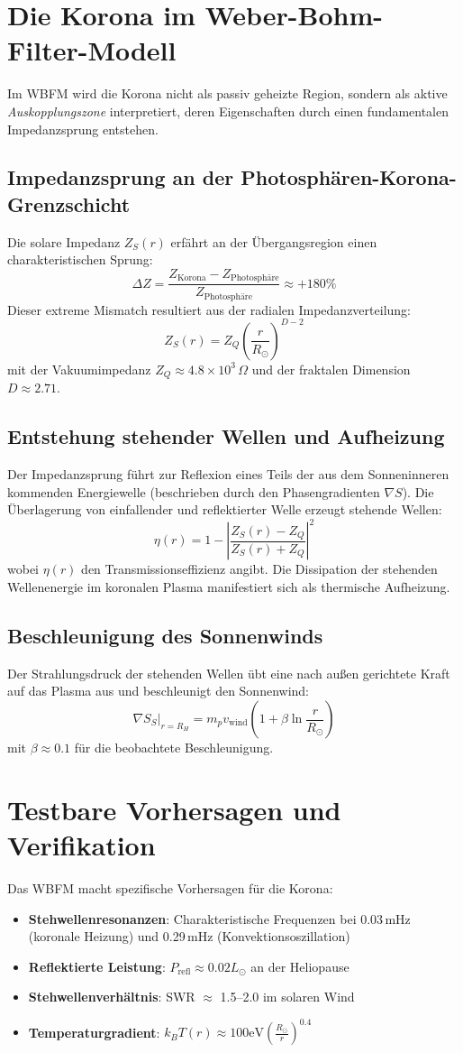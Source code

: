 \section{Die Korona im Weber-Bohm-Filter-Modell}
Im WBFM wird die Korona nicht als passiv geheizte Region, sondern als aktive \textit{Auskopplungszone} interpretiert, deren Eigenschaften durch einen fundamentalen
Impedanzsprung entstehen.

\subsection{Impedanzsprung an der Photosphären-Korona-Grenzschicht}
Die solare Impedanz $Z_S(r)$ erfährt an der Übergangsregion einen charakteristischen Sprung:
\[
\Delta Z = \frac{Z_{\text{Korona}} - Z_{\text{Photosphäre}}}{Z_{\text{Photosphäre}}} \approx +180\%
\]
Dieser extreme Mismatch resultiert aus der radialen Impedanzverteilung:
\[
Z_S(r) = Z_Q \left( \frac{r}{R_\odot} \right)^{D-2}
\]
mit der Vakuumimpedanz $Z_Q \approx 4.8\times 10^3\,\Omega$ und der fraktalen Dimension $D \approx 2.71$.

\subsection{Entstehung stehender Wellen und Aufheizung}
Der Impedanzsprung führt zur Reflexion eines Teils der aus dem Sonneninneren kommenden Energiewelle (beschrieben durch den Phasengradienten $\nabla S$). Die Überlagerung von einfallender und reflektierter Welle erzeugt stehende Wellen:
\[
\eta(r) = 1 - \left| \frac{Z_S(r) - Z_Q}{Z_S(r) + Z_Q} \right|^2
\]
wobei $\eta(r)$ den Transmissionseffizienz angibt. Die Dissipation der stehenden Wellenenergie im koronalen Plasma manifestiert sich als thermische Aufheizung.

\subsection{Beschleunigung des Sonnenwinds}
Der Strahlungsdruck der stehenden Wellen übt eine nach außen gerichtete Kraft auf das Plasma aus und beschleunigt den Sonnenwind:
\[
\nabla S_S|_{r=R_H} = m_p v_{\text{wind}} \left(1 + \beta \ln\frac{r}{R_\odot}\right)
\]
mit $\beta \approx 0.1$ für die beobachtete Beschleunigung.

\section{Testbare Vorhersagen und Verifikation}
Das WBFM macht spezifische Vorhersagen für die Korona:
\begin{itemize}
    \item \textbf{Stehwellenresonanzen}: Charakteristische Frequenzen bei 0.03\,mHz (koronale Heizung) und 0.29\,mHz (Konvektionsoszillation)
    \item \textbf{Reflektierte Leistung}: $P_{\text{refl}} \approx 0.02L_\odot$ an der Heliopause
    \item \textbf{Stehwellenverhältnis}: SWR $\approx$ 1.5--2.0 im solaren Wind
    \item \textbf{Temperaturgradient}: $k_B T(r) \approx 100\text{eV} \left( \frac{R_\odot}{r} \right)^{0.4}$
\end{itemize}


